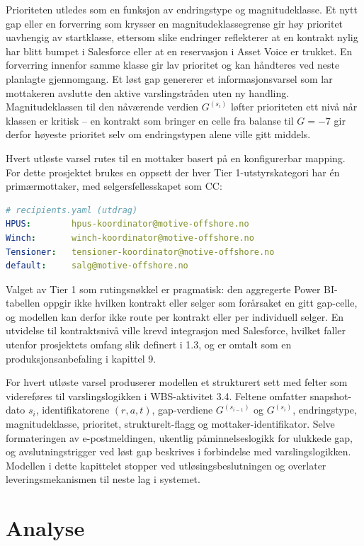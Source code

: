 \documentclass[a4paper,11pt]{article}
\begin{document}
Prioriteten utledes som en funksjon av endringstype og magnitudeklasse. Et nytt gap eller en forverring som krysser en magnitudeklassegrense gir høy prioritet uavhengig av startklasse, ettersom slike endringer reflekterer at en kontrakt nylig har blitt bumpet i Salesforce eller at en reservasjon i Asset Voice er trukket. En forverring innenfor samme klasse gir lav prioritet og kan håndteres ved neste planlagte gjennomgang. Et løst gap genererer et informasjonsvarsel som lar mottakeren avslutte den aktive varslingstråden uten ny handling. Magnitudeklassen til den nåværende verdien $G^{(s_i)}$ løfter prioriteten ett nivå når klassen er kritisk – en kontrakt som bringer en celle fra balanse til $G = -7$ gir derfor høyeste prioritet selv om endringstypen alene ville gitt middels.

Hvert utløste varsel rutes til en mottaker basert på en konfigurerbar mapping. For dette prosjektet brukes en oppsett der hver Tier 1-utstyrskategori har én primærmottaker, med selgersfellesskapet som CC:

\begin{lstlisting}[language=yaml]
# recipients.yaml (utdrag)
HPUS:        hpus-koordinator@motive-offshore.no
Winch:       winch-koordinator@motive-offshore.no
Tensioner:   tensioner-koordinator@motive-offshore.no
default:     salg@motive-offshore.no
\end{lstlisting}

Valget av Tier 1 som rutingsnøkkel er pragmatisk: den aggregerte Power BI-tabellen oppgir ikke hvilken kontrakt eller selger som forårsaket en gitt gap-celle, og modellen kan derfor ikke route per kontrakt eller per individuell selger. En utvidelse til kontraktsnivå ville krevd integrasjon med Salesforce, hvilket faller utenfor prosjektets omfang slik definert i 1.3, og er omtalt som en produksjonsanbefaling i kapittel 9.

For hvert utløste varsel produserer modellen et strukturert sett med felter som videreføres til varslingslogikken i WBS-aktivitet 3.4. Feltene omfatter snapshot-dato $s_i$, identifikatorene $(r, a, t)$, gap-verdiene $G^{(s_{i-1})}$ og $G^{(s_i)}$, endringstype, magnitudeklasse, prioritet, strukturelt-flagg og mottaker-identifikator. Selve formateringen av e-postmeldingen, ukentlig påminnelseslogikk for ulukkede gap, og avslutningstrigger ved løst gap beskrives i forbindelse med varslingslogikken. Modellen i dette kapittelet stopper ved utløsingsbeslutningen og overlater leveringsmekanismen til neste lag i systemet.

\section{Analyse}
\end{document}
